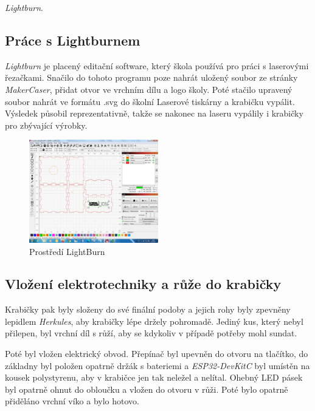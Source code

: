 \textit{Lightburn}\cite{lightburn}.

\subsection{Práce s Lightburnem}
\textit{Lightburn} je placený editační software, který škola používá pro práci s laserovými řezačkami. 
Snačilo do tohoto programu poze nahrát uložený soubor ze stránky \textit{MakerCaser}, přidat otvor ve vrchním dílu a logo školy. Poté stačilo upravený soubor nahrát ve formátu .svg do školní Laserové tiskárny a krabičku vypálit. Výsledek působil reprezentativně, takže se nakonec na laseru vypálily i krabičky pro zbývající výrobky. 



\begin{figure}[htbp]
	\centering
	\includegraphics[width=0.5\textwidth]{img/06 zakl/LightBurn_ukazka.jpg}
	\caption{Prostředí LightBurn}
\end{figure}

\subsection{Vložení elektrotechniky a růže do krabičky}
Krabičky pak byly složeny do své finální podoby a jejich rohy byly zpevněny lepidlem \textit{Herkules}, aby krabičky lépe držely pohromadě. Jediný kus, který nebyl přilepen, byl vrchní díl s růží, aby se kdykoliv v případě potřeby mohl sundat. 


Poté byl vložen elektrický obvod. Přepínač byl upevněn do otvoru na tlačítko, do základny byl položen opatrně držák s bateriemi a \textit{ESP32-DevKitC} byl umístěn na kousek polystyrenu, aby v krabičce jen tak neležel a nelítal. 
Ohebný LED pásek byl opatrně ohnut do obloučku a vložen do otvoru v růži. Poté bylo opatrně přiděláno vrchní víko a bylo hotovo. 

